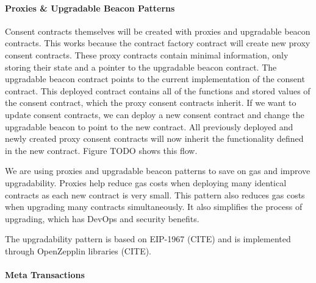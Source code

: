 \paragraph{Proxies & Upgradable Beacon Patterns}
\label{section:BeaconPattern}
%

Consent contracts themselves will be created with proxies and upgradable beacon contracts. This works because the contract factory contract will create new proxy consent contracts. These proxy contracts contain minimal information, only storing their state and a pointer to the upgradable beacon contract. The upgradable beacon contract points to the current implementation of the consent contract. This deployed contract contains all of the functions and stored values of the consent contract, which the proxy consent contracts inherit. If we want to update consent contracts, we can deploy a new consent contract and change the upgradable beacon to point to the new contract. All previously deployed and newly created proxy consent contracts will now inherit the functionality defined in the new contract. Figure TODO shows this flow.

We are using proxies and upgradable beacon patterns to save on gas and improve upgradability. Proxies help reduce gas costs when deploying many identical contracts as each new contract is very small. This pattern also reduces gas costs when upgrading many contracts simultaneously. It also simplifies the process of upgrading, which has DevOps and security benefits.


The upgradability pattern is based on EIP-1967 (CITE) and is implemented through OpenZepplin libraries (CITE).

\paragraph{Meta Transactions}

